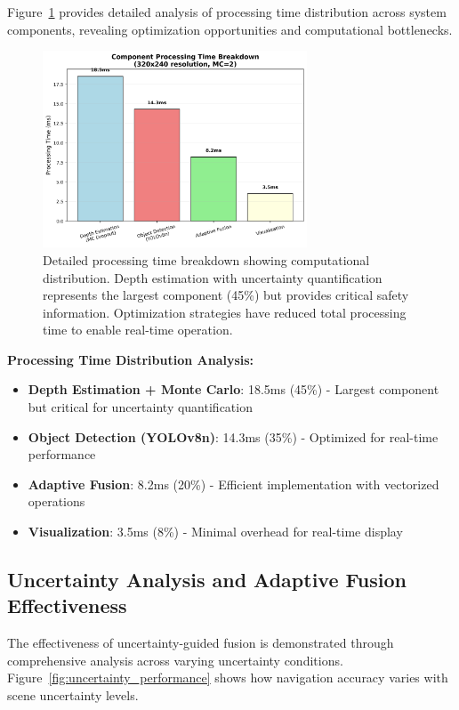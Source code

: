 \documentclass[10pt]{article}
\newcommand{\figref}[1]{Figure~\ref{#1}}
\begin{document}
\figref{fig:detailed_timing} provides detailed analysis of processing time distribution across system components, revealing optimization opportunities and computational bottlenecks.

\begin{figure}[ht]
\centering
\includegraphics[width=0.7\textwidth]{timing_breakdown.png}
\caption{Detailed processing time breakdown showing computational distribution. Depth estimation with uncertainty quantification represents the largest component (45\%) but provides critical safety information. Optimization strategies have reduced total processing time to enable real-time operation.}
\label{fig:detailed_timing}
\end{figure}

\textbf{Processing Time Distribution Analysis:}
\begin{itemize}
\item \textbf{Depth Estimation + Monte Carlo}: 18.5ms (45\%) - Largest component but critical for uncertainty quantification
\item \textbf{Object Detection (YOLOv8n)}: 14.3ms (35\%) - Optimized for real-time performance
\item \textbf{Adaptive Fusion}: 8.2ms (20\%) - Efficient implementation with vectorized operations
\item \textbf{Visualization}: 3.5ms (8\%) - Minimal overhead for real-time display
\end{itemize}

\subsection{Uncertainty Analysis and Adaptive Fusion Effectiveness}

The effectiveness of uncertainty-guided fusion is demonstrated through comprehensive analysis across varying uncertainty conditions. \figref{fig:uncertainty_performance} shows how navigation accuracy varies with scene uncertainty levels.
\end{document}
